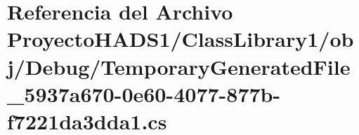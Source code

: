 \hypertarget{_proyecto_h_a_d_s1_2_class_library1_2obj_2_debug_2_temporary_generated_file__5937a670-0e60-4077-877b-f7221da3dda1_8cs}{}\section{Referencia del Archivo Proyecto\+H\+A\+D\+S1/\+Class\+Library1/obj/\+Debug/\+Temporary\+Generated\+File\+\_\+5937a670-\/0e60-\/4077-\/877b-\/f7221da3dda1.cs}
\label{_proyecto_h_a_d_s1_2_class_library1_2obj_2_debug_2_temporary_generated_file__5937a670-0e60-4077-877b-f7221da3dda1_8cs}
